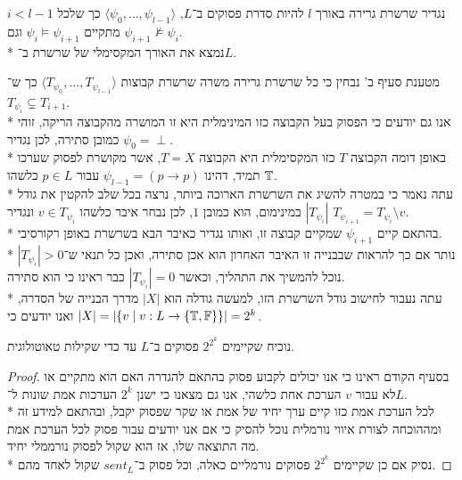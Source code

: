 \Subquestion{}
נגדיר שרשרת גרירה באורך $l$ להיות סדרת פסוקים ב־$L$, $\langle \psi_0, \dots, \psi_{l - 1} \rangle$ כך שלכל $i < l - 1$ מתקיים $\psi_{i} \models \psi_{i + 1}$ וגם $\psi_{i + 1} \not\models \psi_i$. \\*
נמצא את האורך המקסימלי של שרשרת ב־$L$.
\begin{solution}
	מטענת סעיף ב' נבחין כי כל שרשרת גרירה משרה שרשרת קבוצות $\langle T_{\psi_0}, \dots, T_{\psi_{l - 1}} \rangle$ כך ש־$T_{\psi_i} \subsetneq T_{i + 1}$. \\*
	אנו גם יודעים כי הפסוק בעל הקבוצה כזו המינימלית היא זו המושרה מהקבוצה הריקה, זוהי כמובן סתירה, לכן נגדיר $\psi_0 = \perp$. \\*
	באופן דומה הקבוצה $T$ כזו המקסימלית היא הקבוצה $T = X$, אשר מקושרת לפסוק שערכו $\mathbb{T}$ תמיד, דהינו $\psi_{l - 1} = (p \to p)$ עבור $p \in L$ כלשהו. \\*
	עתה נאמר כי במטרה להשיג את השרשרת הארוכה ביותר, נרצה בכל שלב להקטין את גודל $|T_{\psi_i}|$ במינימום, הוא כמובן $1$, לכן נבחר איבר כלשהו $v \in T_{\psi_i}$ ונגדיר $T_{\psi_{i + 1}} = T_{\psi_i} \setminus v$. \\*
	בהתאם קיים $\psi_{i + 1}$ שמקיים קבוצה זו, ואותו נגדיר כאיבר הבא בשרשרת באופן רקורסיבי. \\*
	נותר אם כך להראות שבבנייה זו האיבר האחרון הוא אכן סתירה, ואכן כל תנאי ש־$|T_{\psi_i}| > 0$ נוכל להמשיך את התהליך, וכאשר $|T_{\psi_i}| = 0$ כבר ראינו כי הוא סתירה. \\*
	עתה נעבור לחישוב גודל השרשרת הזו, למעשה גודלה הוא $|X|$ מדרך הבנייה של הסדרה, ואנו יודעים כי $|X| = |\{ v \mid v : L \to \{\mathbb{T}, \mathbb{F}\}\}| = 2^k$.
\end{solution}

\Subquestion{}
נוכיח שקיימים $2^{2^k}$ פסוקים ב־$L$ עד כדי שקילות טאוטולוגית.
\begin{proof}
	בסעיף הקודם ראינו כי אנו יכולים לקבוע פסוק בהתאם להגדרה האם הוא מתקיים או לא עבור $v$ הערכת אחת כלשהי, אנו גם מצאנו כי ישנן $2^k$ הערכות אמת שונות ל־$L$. \\*
	לכל הערכת אמת כזו קיים ערך יחיד של אמת או שקר שפסוק יקבל, ובהתאם למידע זה ומההוכחה לצורת איווי נורמלית נוכל להסיק כי אם אנו יודעים עבור פסוק לכל הערכת אמת מה התוצאה שלו, אז הוא שקול לפסוק נורממלי יחיד. \\*
	נסיק אם כן שקיימים $2^{2^k}$ פסוקים נורמליים כאלה, וכל פסוק ב־$sent_L$ שקול לאחד מהם.
\end{proof}


